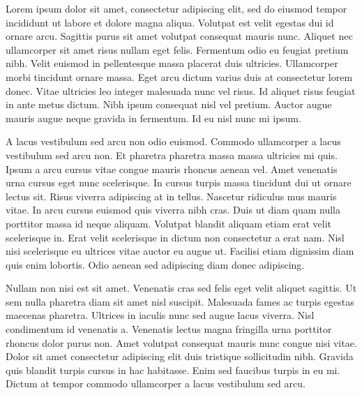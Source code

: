 \tab Lorem ipsum dolor sit amet, consectetur adipiscing elit, sed do eiusmod tempor incididunt ut labore et dolore magna aliqua. Volutpat est velit egestas dui id ornare arcu. Sagittis purus sit amet volutpat consequat mauris nunc. Aliquet nec ullamcorper sit amet risus nullam eget felis. Fermentum odio eu feugiat pretium nibh. Velit euismod in pellentesque massa placerat duis ultricies. Ullamcorper morbi tincidunt ornare massa. Eget arcu dictum varius duis at consectetur lorem donec. Vitae ultricies leo integer malesuada nunc vel risus. Id aliquet risus feugiat in ante metus dictum. Nibh ipsum consequat nisl vel pretium. Auctor augue mauris augue neque gravida in fermentum. Id eu nisl nunc mi ipsum.

A lacus vestibulum sed arcu non odio euismod. Commodo ullamcorper a lacus vestibulum sed arcu non. Et pharetra pharetra massa massa ultricies mi quis. Ipsum a arcu cursus vitae congue mauris rhoncus aenean vel. Amet venenatis urna cursus eget nunc scelerisque. In cursus turpis massa tincidunt dui ut ornare lectus sit. Risus viverra adipiscing at in tellus. Nascetur ridiculus mus mauris vitae. In arcu cursus euismod quis viverra nibh cras. Duis ut diam quam nulla porttitor massa id neque aliquam. Volutpat blandit aliquam etiam erat velit scelerisque in. Erat velit scelerisque in dictum non consectetur a erat nam. Nisl nisi scelerisque eu ultrices vitae auctor eu augue ut. Facilisi etiam dignissim diam quis enim lobortis. Odio aenean sed adipiscing diam donec adipiscing.

Nullam non nisi est sit amet. Venenatis cras sed felis eget velit aliquet sagittis. Ut sem nulla pharetra diam sit amet nisl suscipit. Malesuada fames ac turpis egestas maecenas pharetra. Ultrices in iaculis nunc sed augue lacus viverra. Nisl condimentum id venenatis a. Venenatis lectus magna fringilla urna porttitor rhoncus dolor purus non. Amet volutpat consequat mauris nunc congue nisi vitae. Dolor sit amet consectetur adipiscing elit duis tristique sollicitudin nibh. Gravida quis blandit turpis cursus in hac habitasse. Enim sed faucibus turpis in eu mi. Dictum at tempor commodo ullamcorper a lacus vestibulum sed arcu.